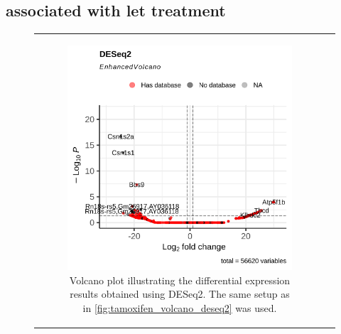 \subsection{ associated with \gls{let} treatment}

\begin{figure}[H] \begin{tabular}{cc} \begin{subfigure}{0.5\textwidth}
                 \centering

                 \includegraphics[width=\linewidth]{chapters/4_results_and_discussion/figures/dea/deseq2/letrozole/volcano.png}
                 \caption{Volcano plot illustrating the differential expression
                     results obtained using DESeq2.
                     The same setup as in \cref{fig:tamoxifen_volcano_deseq2} was used.
                 }
                 \label{fig:letrozole_volcano_deseq2}
             \end{subfigure}
        \begin{subfigure}{0.5\textwidth}
            \centering


\end{subfigure}
\end{tabular}
\end{figure}
